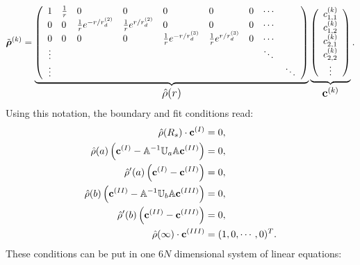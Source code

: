 \begin{equation}
    \tilde{\boldsymbol{\mathbf{\rho}}}^{(k)} = \underbrace{ \left( \begin{array}{cllllllll}
       1   & \frac{1}{r}   & 0                 & 0                 & 0              & 0             & 0 & \cdots &\\
       0   & 0             &\frac{1}{r} e^{-r / r_d^{(2)}}   &\frac{1}{r} e^{r / r_d^{(2)} }   & 0              & 0             & 0 & \cdots &\\
       0   & 0             & 0                 & 0                 &\frac{1}{r} e^{-r / r_d^{(3)}} &\frac{1}{r} e^{r/r_d^{(3)}} & 0 & \cdots &\\
       \vdots  &&&&&&&\ddots &\\
       \vdots  &&&&&&&&\ddots
   \end{array} \right)}_\text{\large$\hat{\rho}(r)$}
   \underbrace{\left(\begin{array}{c}  
       c_{1,1}^{(k)} \\ 
       c_{1,2}^{(k)} \\ 
       c_{2,1}^{(k)} \\ 
       c_{2,2}^{(k)}  \\ 
       \vdots 
   \end{array} \right)}_\text{\large$\boldsymbol{\mathbf{c}}^{(k)}$}.
\end{equation}
Using this notation, the boundary and fit conditions read:
\begin{align}
    \hat{\rho}(R_s) \cdot \boldsymbol{\mathbf{c}}^{(I)} &= 0, \nonumber \\
    \hat{\rho}(a)\left( \boldsymbol{\mathbf{c}}^{(I)} - \mathbb{A}^{-1} \mathbb{U}_a \mathbb{A} \boldsymbol{\mathbf{c}}^{(II)} \right) &= 0, \nonumber \\
    \hat{\rho}'(a)\left( \boldsymbol{\mathbf{c}}^{(I)} - \boldsymbol{\mathbf{c}}^{(II)} \right) &= 0, \nonumber \\
    \hat{\rho}(b)\left( \boldsymbol{\mathbf{c}}^{(II)} - \mathbb{A}^{-1} \mathbb{U}_b \mathbb{A} \boldsymbol{\mathbf{c}}^{(III)} \right) &= 0, \nonumber \\
    \hat{\rho}'(b)\left( \boldsymbol{\mathbf{c}}^{(II)} - \boldsymbol{\mathbf{c}}^{(III)} \right) &= 0, \nonumber \\
    \hat{\rho}(\infty) \cdot \boldsymbol{\mathbf{c}}^{(III)} &=(1,0, \cdots ,0)^{T}. \nonumber 
\end{align}
These conditions can be put in one $6 N$ dimensional system of linear equations:
